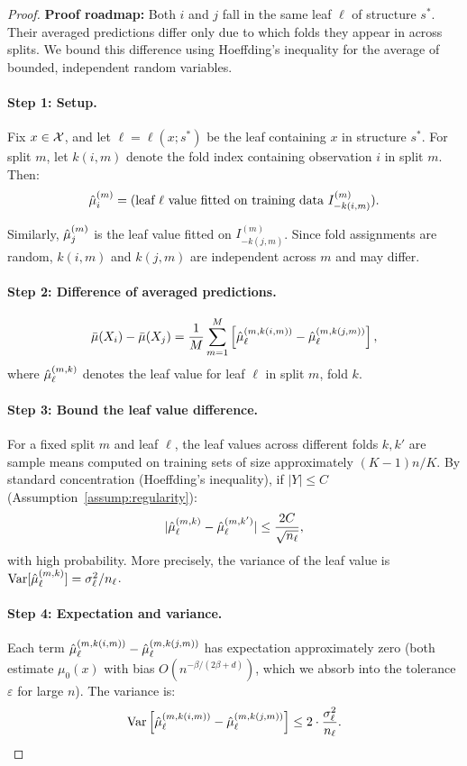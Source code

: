 \documentclass[12pt]{article}
\begin{document}
\begin{proof}
\textbf{Proof roadmap:} Both $i$ and $j$ fall in the same leaf $\ell$ of structure $s^*$. Their averaged predictions differ only due to which folds they appear in across splits. We bound this difference using Hoeffding's inequality for the average of bounded, independent random variables.

\paragraph{Step 1: Setup.}
Fix $x \in \mathcal{X}$, and let $\ell = \ell(x; s^*)$ be the leaf containing $x$ in structure $s^*$. For split $m$, let $k(i, m)$ denote the fold index containing observation $i$ in split $m$. Then:
\[
\hat{\mu}_i^{(m)} = \text{(leaf $\ell$ value fitted on training data } I_{-k(i,m)}^{(m)} \text{)}.
\]

Similarly, $\hat{\mu}_j^{(m)}$ is the leaf value fitted on $I_{-k(j,m)}^{(m)}$. Since fold assignments are random, $k(i, m)$ and $k(j, m)$ are independent across $m$ and may differ.

\paragraph{Step 2: Difference of averaged predictions.}
\[
\bar{\mu}(X_i) - \bar{\mu}(X_j) = \frac{1}{M} \sum_{m=1}^M \left[\hat{\mu}_\ell^{(m, k(i,m))} - \hat{\mu}_\ell^{(m, k(j,m))}\right],
\]
where $\hat{\mu}_\ell^{(m, k)}$ denotes the leaf value for leaf $\ell$ in split $m$, fold $k$.

\paragraph{Step 3: Bound the leaf value difference.}
For a fixed split $m$ and leaf $\ell$, the leaf values across different folds $k, k'$ are sample means computed on training sets of size approximately $(K-1)n/K$. By standard concentration (Hoeffding's inequality), if $|Y| \le C$ (Assumption~\ref{assump:regularity}):
\[
|\hat{\mu}_\ell^{(m, k)} - \hat{\mu}_\ell^{(m, k')}| \le \frac{2C}{\sqrt{n_\ell}},
\]
with high probability. More precisely, the variance of the leaf value is $\operatorname{Var}[\hat{\mu}_\ell^{(m, k)}] = \sigma^2_\ell / n_\ell$.

\paragraph{Step 4: Expectation and variance.}
Each term $\hat{\mu}_\ell^{(m, k(i,m))} - \hat{\mu}_\ell^{(m, k(j,m))}$ has expectation approximately zero (both estimate $\mu_0(x)$ with bias $O(n^{-\beta/(2\beta+d)})$, which we absorb into the tolerance $\varepsilon$ for large $n$). The variance is:
\[
\operatorname{Var}\left[\hat{\mu}_\ell^{(m, k(i,m))} - \hat{\mu}_\ell^{(m, k(j,m))}\right] \le 2 \cdot \frac{\sigma^2_\ell}{n_\ell}.
\]


\end{proof}
\end{document}
